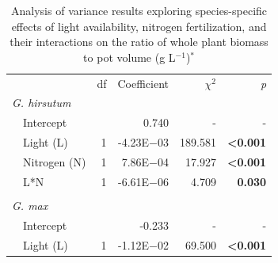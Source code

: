 \newpage
\begin{table}[]
    \caption[Analysis of variance results exploring species-specific effects of light availability, nitrogen fertilization, and their interactions on the ratio of whole plant biomass to pot volume]{Analysis of variance results exploring species-specific effects of light availability, nitrogen fertilization, and their interactions on the ratio of whole plant biomass to pot volume (g L$^{-1}$)$^*$}
    \label{table:tab.a2}
    \centering
        \begin{tabular}{p{0.1cm}p{2.5cm}p{0.5cm}p{1.75cm}p{1.5cm}p{1.5cm}}
         &&&&& 
         \\
         \hline 
         && 
         \multicolumn{1}{r}{df}
         & \multicolumn{1}{r}{Coefficient} & \multicolumn{1}{r}{$\chi^2$} & \multicolumn{1}{r}{\textit{p}}
         \\ 
         \hline
         
         \multicolumn{2}{l}{\textit{G. hirsutum}} &&&&  \\
         & Intercept 
         && \multicolumn{1}{r}{0.740} & \multicolumn{1}{r}{-} & \multicolumn{1}{r}{-} 
         \\
         
         & Light (L)            
         & \multicolumn{1}{r}{1}
         & \multicolumn{1}{r}{-4.23E$-$03}    & \multicolumn{1}{r}{189.581}    & \multicolumn{1}{r}{\textbf{<0.001}}
         \\
         
         & Nitrogen (N)
         & \multicolumn{1}{r}{1} 
         & \multicolumn{1}{r}{7.86E$-$04}    & \multicolumn{1}{r}{17.927}    & \multicolumn{1}{r}{\textbf{<0.001}}
         \\
         
         & L*N
         & \multicolumn{1}{r}{1}            
         & \multicolumn{1}{r}{-6.61E$-$06}     & \multicolumn{1}{r}{4.709}     & \multicolumn{1}{r}{\textbf{0.030}}              
         \\
         &&&&& \\

         \multicolumn{2}{l}{\textit{G. max}} &&&&  \\
         & Intercept 
         && \multicolumn{1}{r}{-0.233} & \multicolumn{1}{r}{-} & \multicolumn{1}{r}{-} 
         \\
         
         & Light (L)            
         & \multicolumn{1}{r}{1}
         & \multicolumn{1}{r}{-1.12E$-$02}    & \multicolumn{1}{r}{69.500}    & \multicolumn{1}{r}{\textbf{<0.001}}
         \\
         

\end{tabular}
\end{table}
